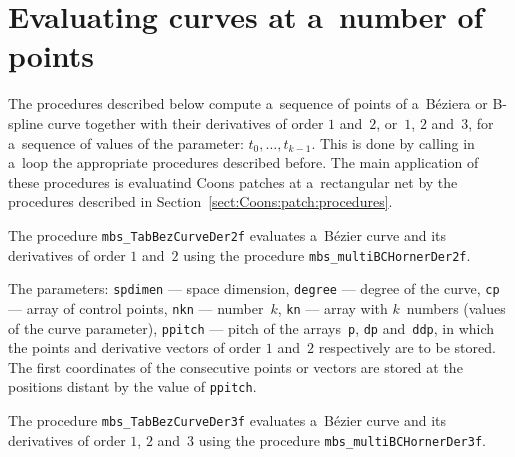 \newpage
\section{Evaluating curves at a~number of points}

The procedures described below compute a~sequence of points of
a~B\'{e}ziera or B-spline curve together with their derivatives of order
$1$ and~$2$, or~$1$, $2$ and~$3$, for a~sequence of values of the parameter:
$t_0,\ldots,t_{k-1}$. This is done by calling in a~loop the appropriate
procedures described before. The main application of these procedures
is evaluatind Coons patches at a~rectangular net
by the procedures described in Section~\ref{sect:Coons:patch:procedures}.

\vspace{\bigskipamount}
The procedure \texttt{mbs\_TabBezCurveDer2f} evaluates a~B\'{e}zier curve
and its derivatives of order $1$ and~$2$ using the procedure
\texttt{mbs\_multiBCHornerDer2f}.

The parameters: \texttt{spdimen} --- space dimension,
\texttt{degree} --- degree of the curve, \texttt{cp} --- array of control points,
\texttt{nkn} --- number~$k$, \texttt{kn} --- array with
$k$~numbers (values of the curve parameter), \texttt{ppitch} --- pitch
of the arrays~\texttt{p}, \texttt{dp} and~\texttt{ddp}, in which the
points and derivative vectors of order $1$ and~$2$ respectively are to be stored.
The first coordinates of the consecutive points or vectors are stored
at the positions distant by the value of \texttt{ppitch}.

\vspace{\bigskipamount}
The procedure \texttt{mbs\_TabBezCurveDer3f} evaluates a~B\'{e}zier curve
and its derivatives of order $1$, $2$ and~$3$ using the procedure
\texttt{mbs\_multiBCHornerDer3f}.

